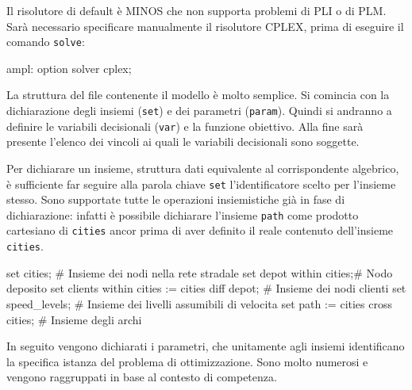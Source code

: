 			Il risolutore di default è MINOS che non supporta problemi di PLI o di PLM. Sarà necessario specificare manualmente il risolutore CPLEX, prima di eseguire il comando \texttt{solve}:

			\begin{amplcode}
				ampl: option solver cplex;
			\end{amplcode}

			La struttura del file contenente il modello è molto semplice. 
			Si comincia con la dichiarazione degli insiemi (\texttt{set}) e dei parametri (\texttt{param}). Quindi si andranno a definire le variabili decisionali (\texttt{var}) e la funzione obiettivo. Alla fine sarà presente l’elenco dei vincoli ai quali le variabili decisionali sono soggette.

			Per dichiarare un insieme, struttura dati equivalente al corrispondente algebrico,  è sufficiente far seguire alla parola chiave \texttt{set} l’identificatore scelto per l’insieme stesso. Sono supportate tutte le operazioni insiemistiche già in fase di dichiarazione: infatti è possibile dichiarare l’insieme \texttt{path} come prodotto cartesiano di \texttt{cities} ancor prima di aver definito il reale contenuto dell’insieme \texttt{cities}.

			\begin{amplcode}
				set cities;				# Insieme dei nodi nella rete stradale
				set depot within cities;# Nodo deposito
				set clients within cities := cities diff depot;	
										# Insieme dei nodi clienti
				set speed_levels;		# Insieme dei livelli assumibili di velocita
				set path := cities cross cities;	
										# Insieme degli archi			
			\end{amplcode}

			In seguito vengono dichiarati i parametri, che unitamente agli insiemi identificano la specifica istanza del problema di ottimizzazione. Sono molto numerosi e vengono raggruppati in base al contesto di competenza.

